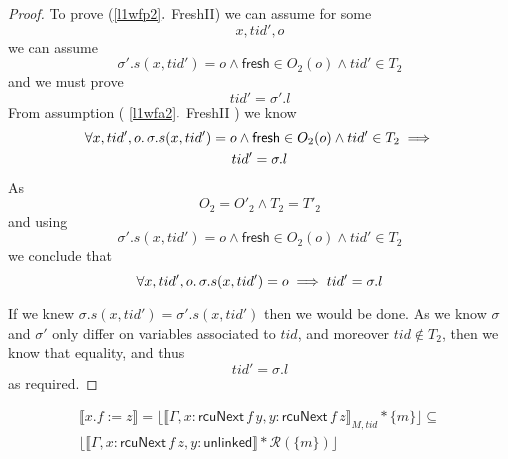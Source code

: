 \begin{proof}

To prove (\ref{l1wfp2}$\ldotp$ \textsf{FreshII}) we can assume for some \[ x, tid', o \]
we can assume
\[ \sigma'.s(x,tid') = o \land \mathsf{fresh} \in O_{2}(o) \land tid' \in T_{2} \]
and we must prove 
\[tid' = \sigma'.l\]
From assumption ( \ref{l1wfa2}$\ldotp$ \textsf{FreshII} ) we know 
\begin{gather*}
\forall x,tid',o \ldotp \sigma.s(x,tid') = o \land \mathsf{fresh} \in O_{2}(o) \land tid' \in T_{2} \implies \\
tid' = \sigma.l 
\end{gather*}
As
\[O_{2} = O'_{2} \land T_{2} = T'_{2}\]
and using 
\[ \sigma'.s(x,tid') = o \land \mathsf{fresh} \in O_{2}(o) \land tid' \in T_{2} \]
we conclude that 
\[ \forall x,tid',o \ldotp \sigma.s(x,tid') = o \implies tid' = \sigma.l \]

If we knew $\sigma.s(x,tid') = \sigma'.s(x,tid')$ then we would be done. As we know $\sigma$ and $\sigma'$ only differ on variables associated to $tid$, and moreover $tid \notin T_{2}$, then we know that equality, and thus
\[tid' = \sigma.l\]
as required.

\end{proof}

\begin{Lemma}
\begin{gather}
\llbracket x.f:=z \rrbracket = \lfloor \llbracket \Gamma,x:\mathsf{rcuNext} \, f \, y, y:\mathsf{rcuNext} \, f \, z \rrbracket_{M,tid} * \{m\}\rfloor  \subseteq \\
\lfloor \llbracket \Gamma,x:\mathsf{rcuNext} \, f \, z, y:\mathsf{unlinked} \rrbracket  * \mathcal{R}(\{m\})\rfloor 
\end{gather}

\end{Lemma}


